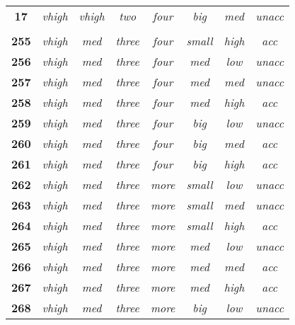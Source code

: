 \begin{longtable}[c]{cccccccc}
\textbf{17} & \textit{vhigh} & \textit{vhigh} & \textit{two} & \textit{four} & \textit{big} & \textit{med} & \textit{unacc} \\
      &       &       &       &       &       &       &  \\
\textbf{255} & \textit{vhigh} & \textit{med} & \textit{three} & \textit{four} & \textit{small} & \textit{high} & \textit{acc} \\
\textbf{256} & \textit{vhigh} & \textit{med} & \textit{three} & \textit{four} & \textit{med} & \textit{low} & \textit{unacc} \\
\textbf{257} & \textit{vhigh} & \textit{med} & \textit{three} & \textit{four} & \textit{med} & \textit{med} & \textit{unacc} \\
\textbf{258} & \textit{vhigh} & \textit{med} & \textit{three} & \textit{four} & \textit{med} & \textit{high} & \textit{acc} \\
\textbf{259} & \textit{vhigh} & \textit{med} & \textit{three} & \textit{four} & \textit{big} & \textit{low} & \textit{unacc} \\
\textbf{260} & \textit{vhigh} & \textit{med} & \textit{three} & \textit{four} & \textit{big} & \textit{med} & \textit{acc} \\
\textbf{261} & \textit{vhigh} & \textit{med} & \textit{three} & \textit{four} & \textit{big} & \textit{high} & \textit{acc} \\
\textbf{262} & \textit{vhigh} & \textit{med} & \textit{three} & \textit{more} & \textit{small} & \textit{low} & \textit{unacc} \\
\textbf{263} & \textit{vhigh} & \textit{med} & \textit{three} & \textit{more} & \textit{small} & \textit{med} & \textit{unacc} \\
\textbf{264} & \textit{vhigh} & \textit{med} & \textit{three} & \textit{more} & \textit{small} & \textit{high} & \textit{acc} \\
\textbf{265} & \textit{vhigh} & \textit{med} & \textit{three} & \textit{more} & \textit{med} & \textit{low} & \textit{unacc} \\
\textbf{266} & \textit{vhigh} & \textit{med} & \textit{three} & \textit{more} & \textit{med} & \textit{med} & \textit{acc} \\
\textbf{267} & \textit{vhigh} & \textit{med} & \textit{three} & \textit{more} & \textit{med} & \textit{high} & \textit{acc} \\
\textbf{268} & \textit{vhigh} & \textit{med} & \textit{three} & \textit{more} & \textit{big} & \textit{low} & \textit{unacc} \\

\end{longtable}
